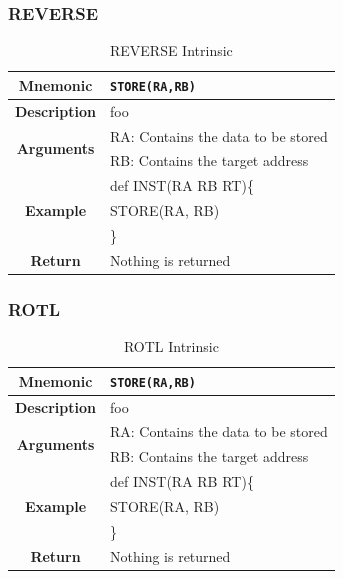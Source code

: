 \documentclass{article}
\begin{document}
\clearpage
\subsubsection{REVERSE}
\label{sec:REVERSE}

\begin{table}[h]
\begin{center}
\caption{REVERSE Intrinsic}
\vspace{0.125in}
\label{tab:REVERSEIntrinsic}
\begin{tabular}{|c|l|}
\hline
\textbf{Mnemonic} & \texttt{STORE(RA,RB)}\\
\hline
\textbf{Description} & foo\\
\hline
\multirow{2}{*}{\textbf{Arguments}} & RA: Contains the data to be stored\\
                          			     & RB: Contains the target address \\
\hline
\multirow{3}{*}{\textbf{Example}} & def INST(RA RB RT)\{\\
                          			  &   STORE(RA, RB)\\
                                                    & \}\\
\hline
\textbf{Return} & Nothing is returned\\                                                    
\hline
\end{tabular}
\end{center}
\end{table}

\clearpage
\subsubsection{ROTL}
\label{sec:ROTL}

\begin{table}[h]
\begin{center}
\caption{ROTL Intrinsic}
\vspace{0.125in}
\label{tab:ROTLIntrinsic}
\begin{tabular}{|c|l|}
\hline
\textbf{Mnemonic} & \texttt{STORE(RA,RB)}\\
\hline
\textbf{Description} & foo\\
\hline
\multirow{2}{*}{\textbf{Arguments}} & RA: Contains the data to be stored\\
                          			     & RB: Contains the target address \\
\hline
\multirow{3}{*}{\textbf{Example}} & def INST(RA RB RT)\{\\
                          			  &   STORE(RA, RB)\\
                                                    & \}\\
\hline
\textbf{Return} & Nothing is returned\\                                                    
\hline
\end{tabular}
\end{center}
\end{table}
\end{document}
